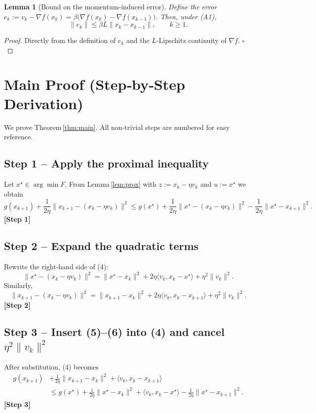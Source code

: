 \documentclass{article}
\newtheorem{lemma}{Lemma}
\begin{document}
\begin{lemma}[Bound on the momentum‑induced error]\label{lem:error}
Define the error $e_k:=v_k-\nabla f(x_k)=\beta\bigl(\nabla f(x_k)-\nabla f(x_{k-1})\bigr)$.  
Then, under (A1),
\[
\|e_k\|\le \beta L\|x_k-x_{k-1}\|,\qquad k\ge 1.
\tag{L3}
\]
\end{lemma}
\begin{proof}
Directly from the definition of $e_k$ and the $L$‑Lipschitz continuity of $\nabla f$. \hfill $\square$
\end{proof}

\section*{Main Proof (Step‑by‑Step Derivation)}
We prove Theorem \ref{thm:main}.  
All non‑trivial steps are numbered for easy reference.

\subsection*{Step 1 – Apply the proximal inequality}
Let $x^{\star}\in\arg\min F$.  
From Lemma \ref{lem:prox} with $z:=x_k-\eta v_k$ and $u:=x^{\star}$ we obtain
\[
g(x_{k+1})+\frac{1}{2\eta}\|x_{k+1}-(x_k-\eta v_k)\|^{2}
\le g(x^{\star})+\frac{1}{2\eta}\|x^{\star}-(x_k-\eta v_k)\|^{2}
-\frac{1}{2\eta}\|x^{\star}-x_{k+1}\|^{2}.
\tag{4}
\]
\textbf{[Step 1]}

\subsection*{Step 2 – Expand the quadratic terms}
Rewrite the right‑hand side of (4):
\[
\|x^{\star}-(x_k-\eta v_k)\|^{2}
= \|x^{\star}-x_k\|^{2}+2\eta\langle v_k, x_k-x^{\star}\rangle+\eta^{2}\|v_k\|^{2}.
\tag{5}
\]
Similarly,
\[
\|x_{k+1}-(x_k-\eta v_k)\|^{2}
= \|x_{k+1}-x_k\|^{2}+2\eta\langle v_k, x_k-x_{k+1}\rangle+\eta^{2}\|v_k\|^{2}.
\tag{6}
\]
\textbf{[Step 2]}

\subsection*{Step 3 – Insert (5)–(6) into (4) and cancel $\eta^{2}\|v_k\|^{2}$}
After substitution, (4) becomes
\[
\begin{aligned}
g(x_{k+1}) &+ \frac{1}{2\eta}\|x_{k+1}-x_k\|^{2}
+ \langle v_k, x_k-x_{k+1}\rangle\\
&\le g(x^{\star})+ \frac{1}{2\eta}\|x^{\star}-x_k\|^{2}
+ \langle v_k, x_k-x^{\star}\rangle
- \frac{1}{2\eta}\|x^{\star}-x_{k+1}\|^{2}.
\end{aligned}
\tag{7}
\]
\textbf{[Step 3]}
\end{document}
